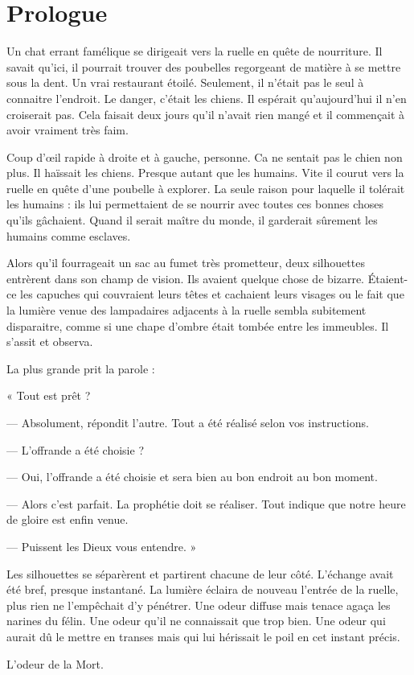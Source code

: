 \chapter{Prologue}
Un chat errant famélique se dirigeait vers la ruelle en quête de nourriture. Il savait qu'ici, il pourrait trouver des 
poubelles regorgeant de matière à se mettre sous la dent. Un vrai restaurant étoilé. Seulement, il n'était pas le 
seul à connaitre l'endroit. Le danger, c'était les chiens. Il espérait qu'aujourd'hui il n'en croiserait pas. Cela 
faisait deux jours qu'il n'avait rien mangé et il commençait à avoir vraiment très faim.

Coup d'œil rapide à droite et à gauche, personne. Ca ne sentait pas le chien non plus. Il haïssait les chiens. 
Presque autant que les humains. Vite il courut  vers la ruelle en quête d'une poubelle à explorer. La seule raison 
pour laquelle il tolérait les humains : ils lui permettaient de se nourrir avec toutes ces bonnes choses qu'ils 
gâchaient. Quand il serait maître du monde, il garderait sûrement les humains comme esclaves. 

Alors qu'il fourrageait un sac au fumet très prometteur, deux silhouettes entrèrent dans son champ de vision. Ils 
avaient quelque chose de bizarre. Étaient-ce les capuches qui couvraient leurs têtes et cachaient leurs visages ou
 le fait que la lumière venue des lampadaires adjacents à la ruelle sembla subitement disparaitre, comme si une chape 
d'ombre était tombée entre les immeubles. Il s'assit et observa.

La plus grande prit la parole :

« Tout est prêt ?

— Absolument, répondit l'autre. Tout a été réalisé selon vos instructions.

— L'offrande a été choisie ?

— Oui, l'offrande a été choisie et sera bien au bon endroit au bon moment. 

— Alors c'est parfait. La prophétie doit se réaliser. Tout indique que notre heure de gloire est enfin venue. 

— Puissent les Dieux vous entendre. »

Les silhouettes se séparèrent et partirent chacune de leur côté. L'é\-change avait été bref, presque instantané. La 
lumière éclaira de nouveau l'entrée de la ruelle, plus rien ne l'empêchait d'y pénétrer. Une odeur diffuse mais tenace 
agaça les narines du félin. Une odeur qu'il ne connaissait que trop bien. Une odeur qui aurait dû le mettre en transes 
mais qui lui hérissait le poil en cet instant précis.

L'odeur de la Mort.